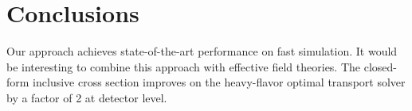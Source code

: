 \section{Conclusions}\label{sec:conclusions}

Our approach achieves state-of-the-art performance on fast simulation.
It would be interesting to combine this approach with effective field
theories. The closed-form inclusive cross section improves on the
heavy-flavor optimal transport solver by a factor of 2 at detector
level.

